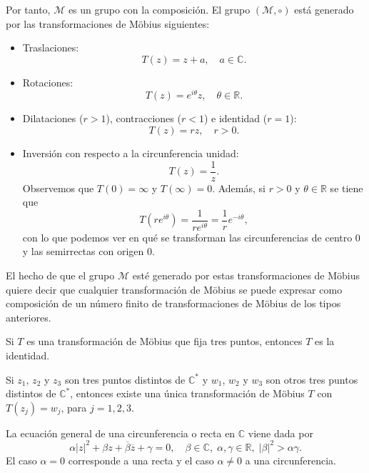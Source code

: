 Por tanto, $\mathcal{M}$ es un grupo con la composición.
El grupo $(\mathcal{M}, \circ)$ está generado por las transformaciones de Möbius siguientes:
\begin{itemize}
    \item Traslaciones:
          $$T(z) = z+a, \quad a \in \mathbb{C}.$$
    \item Rotaciones:
          $$T(z) = e^{i\theta}z, \quad \theta \in \mathbb{R}.$$
    \item Dilataciones ($r > 1$), contracciones ($r < 1$) e identidad ($r = 1$):
          $$T(z) = rz, \quad r > 0.$$
    \item Inversión con respecto a la circunferencia unidad:
          $$T(z) = \frac{1}{z}.$$
          Observemos que $T(0) = \infty$ y $T(\infty) = 0$.
          Además, si $r > 0$ y $\theta \in \mathbb{R}$ se tiene que
          $$T(re^{i\theta}) = \frac{1}{re^{i\theta}} = \frac{1}{r}e^{-i\theta},$$
          con lo que podemos ver en qué se transforman las circunferencias de centro 0 y las semirrectas con origen 0.
\end{itemize}

El hecho de que el grupo $\mathcal{M}$ esté generado por estas transformaciones de Möbius quiere decir que cualquier transformación de Möbius se puede expresar como composición de un número finito de transformaciones de Möbius de los tipos anteriores.

\begin{lemma}
    Si $T$ es una transformación de Möbius que fija tres puntos, entonces $T$ es la identidad.
\end{lemma}

\begin{proposition}
    Si $z_1$, $z_2$ y $z_3$ son tres puntos distintos de $\mathbb{C}^\ast$ y $w_1$, $w_2$ y $w_3$ son otros tres puntos distintos de $\mathbb{C}^\ast$, entonces existe una única transformación de Möbius $T$ con $T(z_j) = w_j$, para $j = 1, 2, 3$.
\end{proposition}

\begin{lemma}
    La ecuación general de una circunferencia o recta en $\mathbb{C}$ viene dada por
    $$\alpha|z|^2 + \beta z + \overline{\beta}\overline{z} + \gamma = 0, \quad \beta \in \mathbb{C}, \; \alpha, \gamma \in \mathbb{R}, \; |\beta|^2 > \alpha\gamma.$$
    El caso $\alpha = 0$ corresponde a una recta y el caso $\alpha \neq 0$ a una circunferencia.
\end{lemma}

